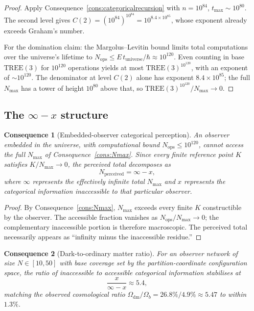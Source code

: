 \documentclass[11pt,twocolumn,a4paper]{article}
\theoremstyle{axiomstyle}
\theoremstyle{conseqstyle}
\newtheorem{consequence}{Consequence}
\theoremstyle{definition}
\theoremstyle{remark}
\begin{document}
\begin{proof}
Apply Consequence~\ref{cons:categoricalrecursion} with $n=10^{84}$, $t_{\max}\sim 10^{80}$. The second level gives $C(2)=(10^{84})^{10^{84}}=10^{8.4\times 10^{85}}$, whose exponent already exceeds Graham's number.

For the domination claim: the Margolus--Levitin bound limits total computations over the universe's lifetime to $N_{\mathrm{ops}}\leq E\,t_{\mathrm{universe}}/\hbar\approx 10^{120}$. Even counting in base $\mathrm{TREE}(3)$ for $10^{120}$ operations yields at most $\mathrm{TREE}(3)^{10^{120}}$, with an exponent of $\sim 10^{120}$. The denominator at level $C(2)$ alone has exponent $8.4\times 10^{85}$; the full $N_{\max}$ has a tower of height $10^{80}$ above that, so $\mathrm{TREE}(3)^{10^{120}}/N_{\max}\to 0$.
\end{proof}

\subsection{The $\infty-x$ structure}

\begin{consequence}[Embedded-observer categorical perception]\label{cons:infminusx}
An observer embedded in the universe, with computational bound $N_{\mathrm{ops}}\leq 10^{120}$, cannot access the full $N_{\max}$ of Consequence~\ref{cons:Nmax}. Since every finite reference point $K$ satisfies $K/N_{\max}\to 0$, the perceived total decomposes as
\begin{equation}
N_{\mathrm{perceived}}=\infty-x,
\end{equation}
where $\infty$ represents the effectively infinite total $N_{\max}$ and $x$ represents the categorical information inaccessible to that particular observer.
\end{consequence}

\begin{proof}
By Consequence~\ref{cons:Nmax}, $N_{\max}$ exceeds every finite $K$ constructible by the observer. The accessible fraction vanishes as $N_{\mathrm{ops}}/N_{\max}\to 0$; the complementary inaccessible portion is therefore macroscopic. The perceived total necessarily appears as ``infinity minus the inaccessible residue.''
\end{proof}

\begin{consequence}[Dark-to-ordinary matter ratio]\label{cons:visibleratio}
For an observer network of size $N\in[10,50]$ with base coverage set by the partition-coordinate configuration space, the ratio of inaccessible to accessible categorical information stabilises at
\begin{equation}
\frac{x}{\infty-x}\approx 5.4,
\end{equation}
matching the observed cosmological ratio $\Omega_{\mathrm{dm}}/\Omega_{b}=26.8\%/4.9\%\approx 5.47$ \citep{planck2018} to within $1.3\%$.
\end{consequence}
\end{document}
